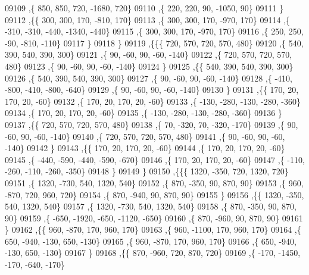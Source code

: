 \begin{DoxyCode}
09109     ,\{   850,   850,   720, -1680,   720\}
09110     ,\{   220,   220,    90, -1050,    90\}
09111     \}
09112    ,\{\{   300,   300,   170,  -810,   170\}
09113     ,\{   300,   300,   170,  -970,   170\}
09114     ,\{  -310,  -310,  -440, -1340,  -440\}
09115     ,\{   300,   300,   170,  -970,   170\}
09116     ,\{   250,   250,   -90,  -810,  -110\}
09117     \}
09118    \}
09119   ,\{\{\{   720,   570,   720,   570,   480\}
09120     ,\{   540,   390,   540,   390,   300\}
09121     ,\{    90,   -60,    90,   -60,  -140\}
09122     ,\{   720,   570,   720,   570,   480\}
09123     ,\{    90,   -60,    90,   -60,  -140\}
09124     \}
09125    ,\{\{   540,   390,   540,   390,   300\}
09126     ,\{   540,   390,   540,   390,   300\}
09127     ,\{    90,   -60,    90,   -60,  -140\}
09128     ,\{  -410,  -800,  -410,  -800,  -640\}
09129     ,\{    90,   -60,    90,   -60,  -140\}
09130     \}
09131    ,\{\{   170,    20,   170,    20,   -60\}
09132     ,\{   170,    20,   170,    20,   -60\}
09133     ,\{  -130,  -280,  -130,  -280,  -360\}
09134     ,\{   170,    20,   170,    20,   -60\}
09135     ,\{  -130,  -280,  -130,  -280,  -360\}
09136     \}
09137    ,\{\{   720,   570,   720,   570,   480\}
09138     ,\{    70,  -320,    70,  -320,  -170\}
09139     ,\{    90,   -60,    90,   -60,  -140\}
09140     ,\{   720,   570,   720,   570,   480\}
09141     ,\{    90,   -60,    90,   -60,  -140\}
09142     \}
09143    ,\{\{   170,    20,   170,    20,   -60\}
09144     ,\{   170,    20,   170,    20,   -60\}
09145     ,\{  -440,  -590,  -440,  -590,  -670\}
09146     ,\{   170,    20,   170,    20,   -60\}
09147     ,\{  -110,  -260,  -110,  -260,  -350\}
09148     \}
09149    \}
09150   ,\{\{\{  1320,  -350,   720,  1320,   720\}
09151     ,\{  1320,  -730,   540,  1320,   540\}
09152     ,\{   870,  -350,    90,   870,    90\}
09153     ,\{   960,  -870,   720,   960,   720\}
09154     ,\{   870,  -940,    90,   870,    90\}
09155     \}
09156    ,\{\{  1320,  -350,   540,  1320,   540\}
09157     ,\{  1320,  -730,   540,  1320,   540\}
09158     ,\{   870,  -350,    90,   870,    90\}
09159     ,\{  -650, -1920,  -650, -1120,  -650\}
09160     ,\{   870,  -960,    90,   870,    90\}
09161     \}
09162    ,\{\{   960,  -870,   170,   960,   170\}
09163     ,\{   960, -1100,   170,   960,   170\}
09164     ,\{   650,  -940,  -130,   650,  -130\}
09165     ,\{   960,  -870,   170,   960,   170\}
09166     ,\{   650,  -940,  -130,   650,  -130\}
09167     \}
09168    ,\{\{   870,  -960,   720,   870,   720\}
09169     ,\{  -170, -1450,  -170,  -640,  -170\}

\end{DoxyCode}
